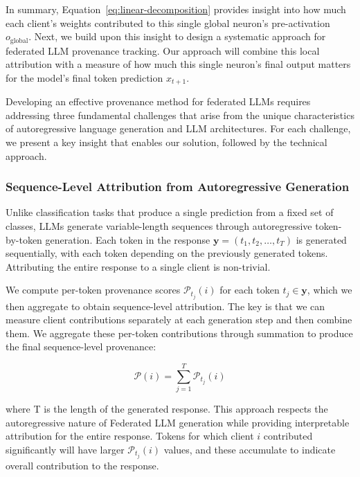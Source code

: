 In summary, Equation~\ref{eq:linear-decomposition} provides insight into how much each client's weights contributed to this single global neuron's pre-activation $o_{\text{global}}$.
Next, we build upon this insight to design a systematic approach for federated LLM provenance tracking.
Our approach will combine this local attribution with a measure of how much this single neuron's final output matters for the model's final token prediction $x_{t+1}$.

Developing an effective provenance method for federated LLMs requires addressing three fundamental challenges that arise from the unique characteristics of autoregressive language generation and LLM architectures.
For each challenge, we present a key insight that enables our solution, followed by the technical approach.

\subsubsection{Sequence-Level Attribution from Autoregressive Generation}
Unlike classification tasks that produce a single prediction from a fixed set of classes, LLMs generate variable-length sequences through autoregressive token-by-token generation.
Each token in the response $\mathbf{y} = (t_1, t_2, \ldots, t_T)$  is generated sequentially, with each token depending on the previously generated tokens.
Attributing the entire response to a single client is non-trivial.

We compute per-token provenance scores $\mathcal{P}_{t_j}(i)$ for each token $t_j \in \mathbf{y}$, which we then aggregate to obtain sequence-level attribution.
The key is that we can measure client contributions separately at each generation step and then combine them.  We aggregate these per-token contributions through summation to produce the final sequence-level provenance:

\begin{equation}
  \label{eq:sequence-provenance}
  \mathcal{P}(i) = \sum_{j=1}^T \mathcal{P}_{t_j}(i)
\end{equation}

where T is the length of the generated response.
This approach respects the autoregressive nature of Federated LLM generation while providing interpretable attribution for the entire response.
Tokens for which client $i$ contributed significantly will have larger $\mathcal{P}_{t_j}(i)$ values, and these accumulate to indicate overall contribution to the response.

